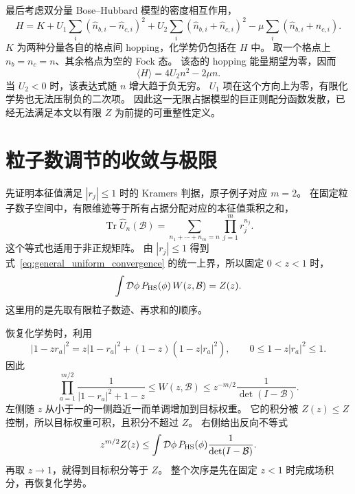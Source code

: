 \documentclass[UTF8,11pt,a4paper,fontset=fandol]{ctexart}
\newcommand{\Tr}{\operatorname{Tr}}
\numberwithin{equation}{section}
\begin{document}
最后考虑双分量 Bose--Hubbard 模型的密度相互作用，
\begin{equation}
 H=K
 +U_1\sum_i(\hat n_{b,i}-\hat n_{c,i})^2
 +U_2\sum_i(\hat n_{b,i}+\hat n_{c,i})^2
 -\mu\sum_i(\hat n_{b,i}+\hat n_{c,i}).
 \label{eq:densitybenchmark}
\end{equation}
$K$ 为两种分量各自的格点间 hopping，化学势仍包括在 $H$ 中。
取一个格点上 $n_b=n_c=n$、其余格点为空的 Fock 态。
该态的 hopping 能量期望为零，因而
\begin{equation}
 \langle H\rangle=4U_2n^2-2\mu n.
\end{equation}
当 $U_2<0$ 时，该表达式随 $n$ 增大趋于负无穷。
$U_1$ 项在这个方向上为零，有限化学势也无法压制负的二次项。
因此这一无限占据模型的巨正则配分函数发散，已经无法满足本文以有限 $Z$ 为前提的可重整性定义。

\appendix
\section{粒子数调节的收敛与极限}
\label{app:regulator}

先证明本征值满足 $|r_j|\le1$ 时的 Kramers 判据，原子例子对应 $m=2$。
在固定粒子数子空间中，有限维迹等于所有占据分配对应的本征值乘积之和，
\begin{equation}
 \Tr\hat U_n(\mathcal B)
 =\sum_{n_1+\cdots+n_m=n}\prod_{j=1}^{m}r_j^{n_j}.
\end{equation}
这个等式也适用于非正规矩阵。
由 $|r_j|\le1$ 得到式~\eqref{eq:general_uniform_convergence} 的统一上界，所以固定 $0<z<1$ 时，
\begin{equation}
 \int\mathcal D\phi\,P_{\rm HS}(\phi)\,
 W(z,\mathcal B)=Z(z).
\end{equation}
这里用的是先取有限粒子数迹、再求和的顺序。

恢复化学势时，利用
\begin{equation}
 |1-zr_a|^2
 =z|1-r_a|^2+(1-z)(1-z|r_a|^2),
 \qquad 0\le1-z|r_a|^2\le1.
\end{equation}
因此
\begin{equation}
 \prod_{a=1}^{m/2}\frac1{|1-r_a|^2+1-z}
 \le W(z,\mathcal B)
 \le z^{-m/2}\frac1{\det(I-\mathcal B)}.
 \label{eq:general_sandwich}
\end{equation}
左侧随 $z$ 从小于一的一侧趋近一而单调增加到目标权重。
它的积分被 $Z(z)\le Z$ 控制，所以目标权重可积，且积分不超过 $Z$。
右侧给出反向不等式
\begin{equation}
 z^{m/2}Z(z)
 \le\int\mathcal D\phi\,P_{\rm HS}(\phi)
       \frac1{\det(I-\mathcal B)}.
\end{equation}
再取 $z\to1$，就得到目标积分等于 $Z$。
整个次序是先在固定 $z<1$ 时完成场积分，再恢复化学势。
\end{document}
